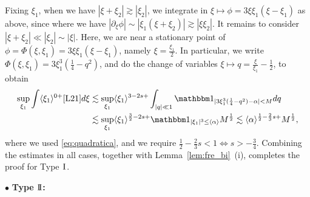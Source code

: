 \documentclass[%
11pt,  reqno]{amsart}
\newcommand{\I}{\hspace{0.2mm}\textup{I}\hspace{0.2mm}}
\newcommand{\II}{\textup{I \hspace{-2.9mm} I} }
\newcommand{\5}{\textup{V}}
\newcommand{\noi}{\noindent}
\newcommand{\ind}{\mathbbm 1}
\newcommand{\les}{\lesssim}
\theoremstyle{remark}
\newcommand{\bul}{\bullet}
\newcommand{\al}{\alpha}
\newcommand{\ges}{\gtrsim}
\newcommand{\jb}[1]
{\langle #1 \rangle}
\numberwithin{equation}{section}
\numberwithin{theorem}{section}
\begin{document}
Fixing $\xi_1$, when we have $|\xi+\xi_2| \ges |\xi_2|$, we integrate in $\xi \mapsto \phi = 3 \xi \xi_1 (\xi-\xi_1)$ as above, since
where we have $|\partial_\xi \phi | \sim |\xi_1 (\xi + \xi_2)| \ges |\xi \xi_2|$. 
It remains to consider $|\xi + \xi_2| \ll |\xi_2| \sim |\xi|$. Here, we are near a stationary point of $\phi = \Phi(\xi,\xi_1) = 3 \xi \xi_1 (\xi-\xi_1)$, namely $\xi = \frac{\xi_1}{2}$. In particular, we write $\Phi(\xi, \xi_1) =3  \xi_1^3 (\frac14 - q^2)$, and do the change of variables $\xi \mapsto q = \frac{\xi}{\xi_1} - \frac12$, to obtain 
\begin{align}
\sup_{\xi_1} \int \jb{\xi_1}^{0+} \eqref{L21} d\xi 
&
\les 
\sup_{\xi_1} \jb{\xi_1}^{3-2s + }  \int_{|q| \ll 1} \ind_{| 3 \xi_1^3 (\frac14 - q^2) - \al| < M } d q
\\
&
\les 
\sup_{\xi_1} \jb{\xi_1}^{\frac32 -2s + } \ind_{|\xi_1|^3 \le \jb{\al}} M^\frac12
\les 
\jb{\al}^{\frac12 - \frac23 s +} M^\frac12,
\end{align}
where we used \eqref{eq:quadratica}, and we require $\frac12 - \frac23 s < 1 \iff s> -\frac34$. 
Combining the estimates in all cases, together with Lemma~\ref{lem:fre_bi}~(i), completes the proof for Type $\I$.



\medskip

\noi
$\bul$ \textbf{Type $\II$:}
\end{document}
